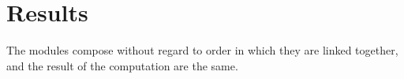 
\section{Results}
The modules compose without regard to order in which they are linked together, and the result of the computation are the same.